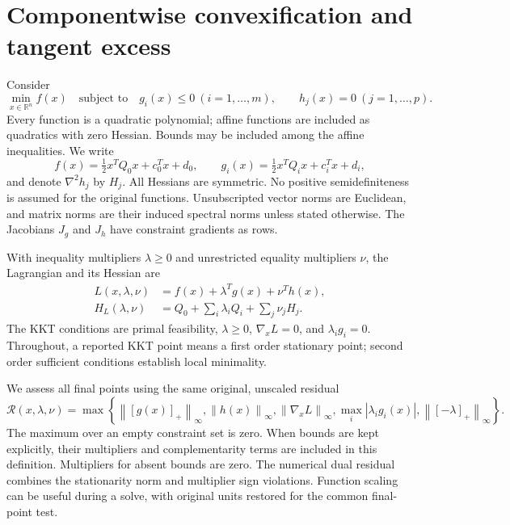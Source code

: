 \documentclass[pdflatex,sn-mathphys-num]{sn-jnl}
\theoremstyle{thmstyleone}
\theoremstyle{thmstylethree}
\newcommand{\R}{\mathbb R}
\newcommand{\norm}[1]{\left\lVert#1\right\rVert}
\begin{document}
\section{Componentwise convexification and tangent excess}\label{sec:model}
Consider
\begin{equation}\label{eq:problem}
 \min_{x\in\R^n} f(x)\quad\text{subject to}\quad
 g_i(x)\leq0\ (i=1,\ldots,m),\qquad
 h_j(x)=0\ (j=1,\ldots,p).
\end{equation}
Every function is a quadratic polynomial; affine functions are included
as quadratics with zero Hessian. Bounds may be included among the affine
inequalities. We write
\[
 f(x)=\tfrac12 x^TQ_0x+c_0^Tx+d_0,\qquad
 g_i(x)=\tfrac12 x^TQ_ix+c_i^Tx+d_i,
\]
and denote $\nabla^2h_j$ by $H_j$. All Hessians are symmetric. No
positive semidefiniteness is assumed for the original functions.
Unsubscripted vector norms are Euclidean, and matrix norms are their
induced spectral norms unless stated otherwise.
The Jacobians $J_g$ and $J_h$ have constraint gradients as rows.

With inequality multipliers $\lambda\geq0$ and unrestricted equality
multipliers $\nu$, the Lagrangian and its Hessian are
\begin{align}
 L(x,\lambda,\nu)&=f(x)+\lambda^Tg(x)+\nu^Th(x),\label{eq:lagrangian}\\
 H_L(\lambda,\nu)&=Q_0+\sum_i\lambda_iQ_i+\sum_j\nu_jH_j.
 \label{eq:lagrangian-hessian}
\end{align}
The KKT conditions are primal feasibility, $\lambda\geq0$,
$\nabla_xL=0$, and $\lambda_i g_i=0$. Throughout, a reported KKT point means a first order stationary point;
second order sufficient conditions establish local minimality.

We assess all final points using the same original, unscaled residual
\begin{equation}\label{eq:kkt-residual}
 \mathcal R(x,\lambda,\nu)=\max\left\{
 \norm{[g(x)]_+}_\infty,\norm{h(x)}_\infty,
 \norm{\nabla_xL}_\infty,
 \max_i|\lambda_i g_i(x)|,\norm{[-\lambda]_+}_\infty\right\}.
\end{equation}
The maximum over an empty constraint set is zero. When bounds are kept
explicitly, their multipliers and complementarity terms are included in
this definition. Multipliers for absent bounds are zero. The numerical dual residual
combines the stationarity norm and multiplier sign violations. Function
scaling can be useful during a solve, with original units restored for
the common final-point test.
\end{document}
